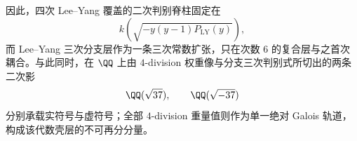 因此，四次 Lee--Yang 覆盖的二次判别脊柱固定在
\[
k\!\left(\sqrt{-y(y-1)P_{\mathrm{LY}}(y)}\right),
\]
而 Lee--Yang 三次分支层作为一条三次常数扩张，只在次数 \(6\) 的复合层与之首次耦合。与此同时，在 \(\QQ\) 上由 \(4\)-division 权重像与分支三次判别式所切出的两条二次影
\[
\QQ(\sqrt{37}),\qquad \QQ(\sqrt{-37})
\]
分别承载实符号与虚符号；全部 \(4\)-division 重量值则作为单一绝对 Galois 轨道，构成该代数壳层的不可再分分量。
